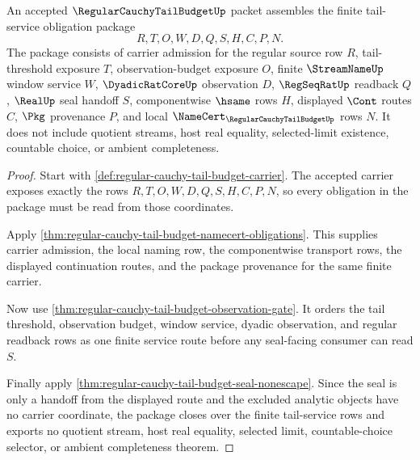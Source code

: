 \begin{theorem}
\label{thm:regular-cauchy-tail-budget-obligation-package}
An accepted $\RegularCauchyTailBudgetUp$ packet assembles the finite tail-service obligation package
$$
R,T,O,W,D,Q,S,H,C,P,N.
$$
The package consists of carrier admission for the regular source row $R$, tail-threshold exposure $T$, observation-budget exposure $O$, finite $\StreamNameUp$ window service $W$, $\DyadicRatCoreUp$ observation $D$, $\RegSeqRatUp$ readback $Q$, $\RealUp$ seal handoff $S$, componentwise $\hsame$ rows $H$, displayed $\Cont$ routes $C$, $\Pkg$ provenance $P$, and local $\NameCert_{\RegularCauchyTailBudgetUp}$ rows $N$. It does not include quotient streams, host real equality, selected-limit existence, countable choice, or ambient completeness.
\end{theorem}
\begin{proof}
Start with \autoref{def:regular-cauchy-tail-budget-carrier}. The accepted carrier exposes exactly the rows $R,T,O,W,D,Q,S,H,C,P,N$, so every obligation in the package must be read from those coordinates.

Apply \autoref{thm:regular-cauchy-tail-budget-namecert-obligations}. This supplies carrier admission, the local naming row, the componentwise transport rows, the displayed continuation routes, and the package provenance for the same finite carrier.

Now use \autoref{thm:regular-cauchy-tail-budget-observation-gate}. It orders the tail threshold, observation budget, window service, dyadic observation, and regular readback rows as one finite service route before any seal-facing consumer can read $S$.

Finally apply \autoref{thm:regular-cauchy-tail-budget-seal-nonescape}. Since the seal is only a handoff from the displayed route and the excluded analytic objects have no carrier coordinate, the package closes over the finite tail-service rows and exports no quotient stream, host real equality, selected limit, countable-choice selector, or ambient completeness theorem.
\end{proof}

